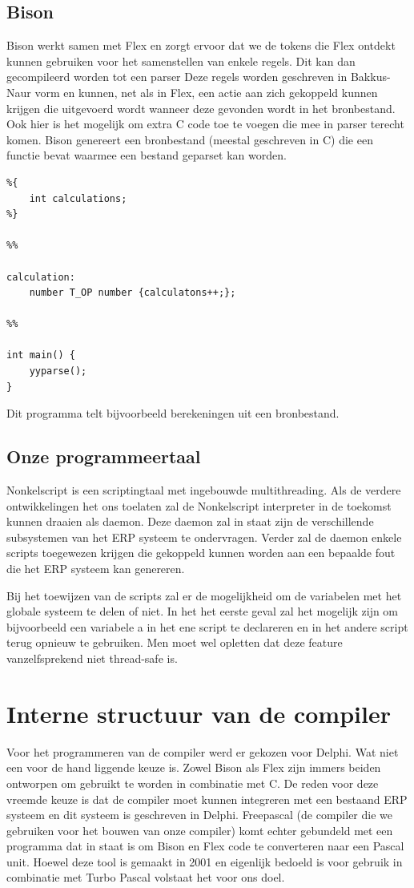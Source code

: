 \documentclass[11pt,a4paper]{article}
\begin{document}
\subsection{Bison}
Bison werkt samen met Flex en zorgt ervoor dat we de tokens die Flex ontdekt kunnen gebruiken voor het samenstellen van enkele regels. Dit kan dan gecompileerd worden tot een parser Deze regels worden geschreven in Bakkus-Naur vorm en kunnen, net als in Flex, een actie aan zich gekoppeld kunnen krijgen die uitgevoerd wordt wanneer deze gevonden wordt in het bronbestand. Ook hier is het mogelijk om extra C code toe te voegen die mee in parser terecht komen. Bison genereert een bronbestand (meestal geschreven in C) die een functie bevat waarmee een bestand geparset kan worden.

\begin{verbatim}
%{
	int calculations;
%}

%%

calculation:
	number T_OP number {calculatons++;};

%%

int main() {
	yyparse();
}
\end{verbatim}

Dit programma telt bijvoorbeeld berekeningen uit een bronbestand.

\subsection{Onze programmeertaal}
Nonkelscript is een scriptingtaal met ingebouwde multithreading. Als de verdere ontwikkelingen het ons toelaten zal de Nonkelscript interpreter in de toekomst kunnen draaien als daemon. Deze daemon zal in staat zijn de verschillende subsystemen van het ERP systeem te ondervragen. Verder zal de daemon enkele scripts toegewezen krijgen die gekoppeld kunnen worden aan een bepaalde fout die het ERP systeem kan genereren.

Bij het toewijzen van de scripts zal er de mogelijkheid om de variabelen met het globale systeem te delen of niet. In het het eerste geval zal het mogelijk zijn om bijvoorbeeld een variabele a in het ene script te declareren en in het andere script terug opnieuw te gebruiken. Men moet wel opletten dat deze feature vanzelfsprekend niet thread-safe is.

\section{Interne structuur van de compiler}
Voor het programmeren van de compiler werd er gekozen voor Delphi. Wat niet een voor de hand liggende keuze is. Zowel Bison als Flex zijn immers beiden ontworpen om gebruikt te worden in combinatie met C. De reden voor deze vreemde keuze is dat de compiler moet kunnen integreren met een bestaand ERP systeem en dit systeem is geschreven in Delphi. Freepascal (de compiler die we gebruiken voor het bouwen van onze compiler) komt echter gebundeld met een programma dat in staat is om Bison en Flex code te converteren naar een Pascal unit. Hoewel deze tool is gemaakt in 2001 en eigenlijk bedoeld is voor gebruik in combinatie met Turbo Pascal volstaat het voor ons doel.
\end{document}
